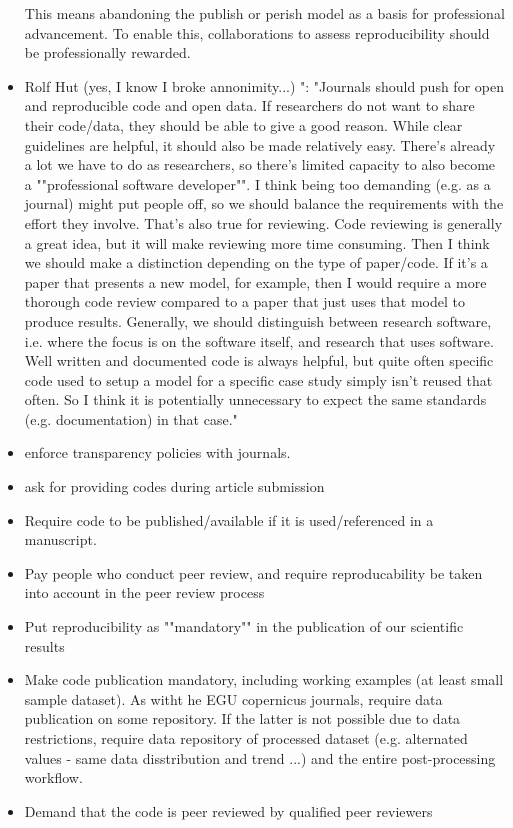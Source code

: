 \documentclass{article}
\begin{document}
\begin{itemize}
This means abandoning the publish or perish model as a basis for professional advancement.
To enable this, collaborations to assess reproducibility should be professionally rewarded.
	\item Rolf Hut (yes, I know I broke annonimity...) ":
"Journals should push for open and reproducible code and open data. If researchers do not want to share their code/data, they should be able to give a good reason.
While clear guidelines are helpful, it should also be made relatively easy. There's already a lot we have to do as researchers, so there's limited capacity to also become a ""professional software developer"". I think being too demanding (e.g. as a journal) might put people off, so we should balance the requirements with the effort they involve. That's also true for reviewing. Code reviewing is generally a great idea, but it will make reviewing more time consuming. 
Then I think we should make a distinction depending on the type of paper/code. If it's a paper that presents a new model, for example, then I would require a more thorough code review compared to a paper that just uses that model to produce results. Generally, we should distinguish between research software, i.e. where the focus is on the software itself, and research that uses software. Well written and documented code is always helpful, but quite often specific code used to setup a model for a specific case study simply isn't reused that often. So I think it is potentially unnecessary to expect the same standards (e.g. documentation) in that case."
	\item enforce transparency policies with journals.
	\item ask for providing codes during article submission
	\item Require code to be published/available if it is used/referenced in a manuscript.
	\item Pay people who conduct peer review, and require reproducability be taken into account in the peer review process
	\item Put reproducibility as ""mandatory"" in the publication of our scientific results
	\item Make code publication mandatory, including working examples (at least small sample dataset). As witht he EGU copernicus journals, require data publication on some repository. If the latter is not possible due to data restrictions, require data repository of processed dataset (e.g. alternated values - same data disstribution and trend ...) and the entire post-processing workflow.
	\item Demand that the code is peer reviewed by qualified peer reviewers
\end{itemize}
\end{document}
